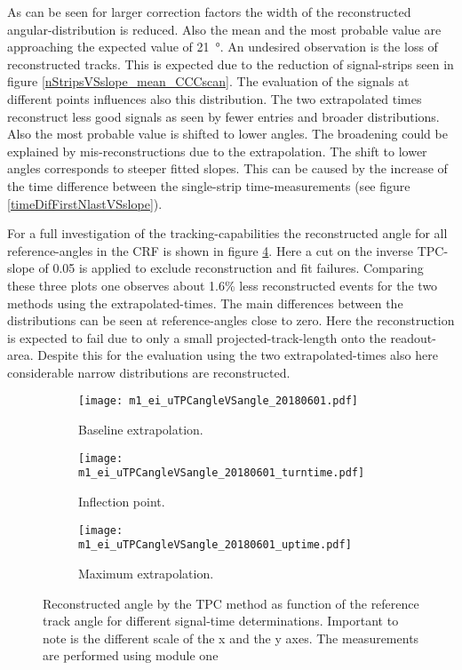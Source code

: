 \documentclass[
twoside,            %
BCOR1.4cm,          %
10pt,               %
headings=normal,    %
headsepline,        %
clearplainpage,		%
final,              %
div=14,
open=right,
bibliography=toc
]{scrreprt}
\begin{document}
As can be seen for larger correction factors the width of the reconstructed angular-distribution is reduced.
Also the mean and the most probable value are approaching the expected value of \SI{21}{\degree}.
An undesired observation is the loss of reconstructed tracks.
This is expected due to the reduction of signal-strips seen in figure \ref{nStripsVSslope_mean_CCCscan}.
The evaluation of the signals at different points influences also this distribution.
The two extrapolated times reconstruct less good signals as seen by fewer entries and broader distributions.
Also the most probable value is shifted to lower angles.
The broadening could be explained by mis-reconstructions due to the extrapolation.
The shift to lower angles corresponds to steeper fitted slopes.
This can be caused by the increase of the time difference between the single-strip time-measurements (see figure \ref{timeDifFirstNlastVSslope}).

For a full investigation of the tracking-capabilities the reconstructed angle for all reference-angles in the CRF is shown in figure \ref{uTPCangleVSangle}.
Here a cut on the inverse \textmu TPC-slope of 0.05 is applied to exclude reconstruction and fit failures.
Comparing these three plots one observes about 1.6\% less reconstructed events for the two methods using the extrapolated-times.
The main differences between the distributions can be seen at reference-angles close to zero.
Here the reconstruction is expected to fail due to only a small projected-track-length onto the readout-area.
Despite this for the evaluation using the two extrapolated-times also here considerable narrow distributions are reconstructed.

\begin{figure}[!h]
	\begin{subfigure}[b]{0.32\textwidth}
		\centering
		\texttt{[image: m1\_ei\_uTPCangleVSangle\_20180601.pdf]}
		\caption{Baseline extrapolation.}
		\label{uTPCangleVSangle_down} 
	\end{subfigure}
	\hfill
	\begin{subfigure}[b]{0.32\textwidth}
		\centering
		\texttt{[image: m1\_ei\_uTPCangleVSangle\_20180601\_turntime.pdf]}
		\caption{Inflection point.}
		\label{uTPCangleVSangle_tt} 
	\end{subfigure}
	\hfill
	\begin{subfigure}[b]{0.32\textwidth}
		\centering
		\texttt{[image: m1\_ei\_uTPCangleVSangle\_20180601\_uptime.pdf]}
		\caption{Maximum extrapolation.}
		\label{uTPCangleVSangle_up} 
	\end{subfigure}
	\vspace{-2mm}
	\caption{
		Reconstructed angle by the \textmu TPC method as function of the reference track angle for different signal-time determinations.
		Important to note is the different scale of the x and the y axes.
		The measurements are performed using module one 
	}
	\label{uTPCangleVSangle}
\end{figure}
\end{document}
